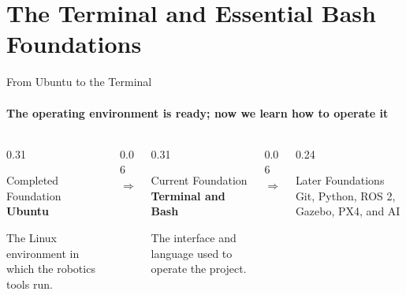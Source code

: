 \section{The Terminal and Essential Bash Foundations}



\begin{frame}{From Ubuntu to the Terminal}
\framesubtitle{The operating environment is ready; now we learn how to operate it}

\footnotesize

\begin{columns}[T,onlytextwidth]
    \begin{column}{0.31\textwidth}
        \begin{block}{Completed Foundation}
            \centering
            \textbf{Ubuntu}\par
            \scriptsize
            The Linux environment in which the robotics tools run.
        \end{block}
    \end{column}

    \begin{column}{0.06\textwidth}
        \centering
        \vspace{0.55cm}
        $\Longrightarrow$
    \end{column}

    \begin{column}{0.31\textwidth}
        \begin{exampleblock}{Current Foundation}
            \centering
            \textbf{Terminal and Bash}\par
            \scriptsize
            The interface and language used to operate the project.
        \end{exampleblock}
    \end{column}

    \begin{column}{0.06\textwidth}
        \centering
        \vspace{0.55cm}
        $\Longrightarrow$
    \end{column}

    \begin{column}{0.24\textwidth}
        \begin{block}{Later Foundations}
            \centering
            \scriptsize
            Git, Python, ROS 2, Gazebo, PX4, and AI
        \end{block}
    \end{column}
\end{columns}


\end{frame}
